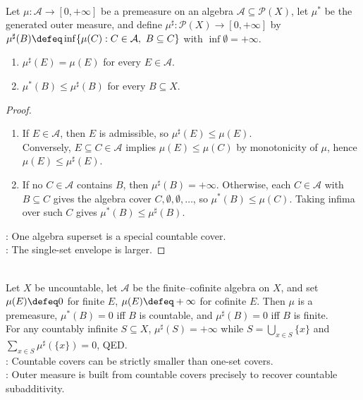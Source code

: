\begin{proposition} \label{prop:single-set-envelope-vs-generated-outer-measure} \\
Let $\mu:\mathcal{A}\to[0,+\infty]$ be a premeasure on an algebra $\mathcal{A}\subseteq\mathcal{P}(X)$, let $\mu^\ast$ be the generated outer measure, and define $\mu^\sharp:\mathcal{P}(X)\to[0,+\infty]$ by $\mu^\sharp(B)\defeq\inf\{\mu(C):C\in\mathcal{A},\ B\subseteq C\}$ with $\inf\emptyset=+\infty$.
\begin{enumerate}[label=(\roman*)]
\setlength{\itemsep}{0pt}
\item $\mu^\sharp(E)=\mu(E)$ for every $E\in\mathcal{A}$.
\item $\mu^\ast(B)\leq\mu^\sharp(B)$ for every $B\subseteq X$.
\end{enumerate}
\begin{proof}
\begin{enumerate}[label=(\roman*)]
\setlength{\itemsep}{0pt}
\item If $E\in\mathcal{A}$, then $E$ is admissible, so $\mu^\sharp(E)\leq\mu(E)$.\\
Conversely, $E\subseteq C\in\mathcal{A}$ implies $\mu(E)\leq\mu(C)$ by monotonicity of $\mu$, hence $\mu(E)\leq\mu^\sharp(E)$.
\item If no $C\in\mathcal{A}$ contains $B$, then $\mu^\sharp(B)=+\infty$. Otherwise, each $C\in\mathcal{A}$ with $B\subseteq C$ gives the algebra cover $C,\emptyset,\emptyset,\ldots$, so $\mu^\ast(B)\leq\mu(C)$. Taking infima over such $C$ gives $\mu^\ast(B)\leq\mu^\sharp(B)$.
\end{enumerate}
: One algebra superset is a special countable cover.\\
: The single-set envelope is larger.
\end{proof}
\end{proposition}

\begin{example} \label{ex:single-set-envelope-not-outer-measure} \\
Let $X$ be uncountable, let $\mathcal{A}$ be the finite--cofinite algebra on $X$, and set $\mu(E)\defeq0$ for finite $E$, $\mu(E)\defeq+\infty$ for cofinite $E$. Then $\mu$ is a premeasure, $\mu^\ast(B)=0$ iff $B$ is countable, and $\mu^\sharp(B)=0$ iff $B$ is finite.\\
For any countably infinite $S\subseteq X$, $\mu^\sharp(S)=+\infty$ while $S=\bigcup_{x\in S}\{x\}$ and $\sum_{x\in S}\mu^\sharp(\{x\})=0$, QED.\\
: Countable covers can be strictly smaller than one-set covers.\\
: Outer measure is built from countable covers precisely to recover countable subadditivity.
\end{example}

